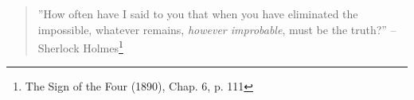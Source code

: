 \newpage
\begin{quote}
''How often have I said to you that when you have eliminated the impossible, whatever remains, \emph{however improbable}, must be the truth?'' -- Sherlock Holmes\footnote{The Sign of the Four (1890), Chap. 6, p. 111}
\end{quote}







%

